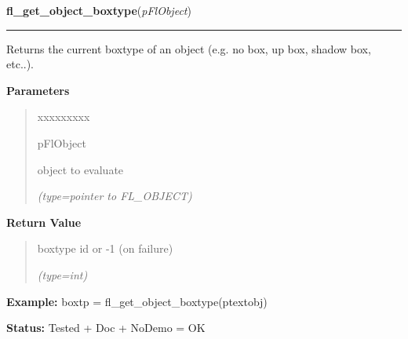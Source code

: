     \vspace{0.5ex}

\hspace{.8\funcindent}\begin{boxedminipage}{\funcwidth}

    \raggedright \textbf{fl\_get\_object\_boxtype}(\textit{pFlObject})

    \vspace{-1.5ex}

    \rule{\textwidth}{0.5\fboxrule}
\setlength{\parskip}{2ex}
    Returns the current boxtype of an object (e.g. no box, up box, shadow 
    box, etc..).

\setlength{\parskip}{1ex}
      \textbf{Parameters}
      \vspace{-1ex}

      \begin{quote}
        \begin{Ventry}{xxxxxxxxx}

          \item[pFlObject]

          object to evaluate

            {\it (type=pointer to FL\_OBJECT)}

        \end{Ventry}

      \end{quote}

      \textbf{Return Value}
    \vspace{-1ex}

      \begin{quote}
      boxtype id or -1 (on failure)

      {\it (type=int)}

      \end{quote}

\textbf{Example:} boxtp = fl\_get\_object\_boxtype(ptextobj)



\textbf{Status:} Tested + Doc + NoDemo = OK



    \end{boxedminipage}

    \label{xformslib:flbasic:fl_set_object_bw}

    \vspace{0.5ex}

